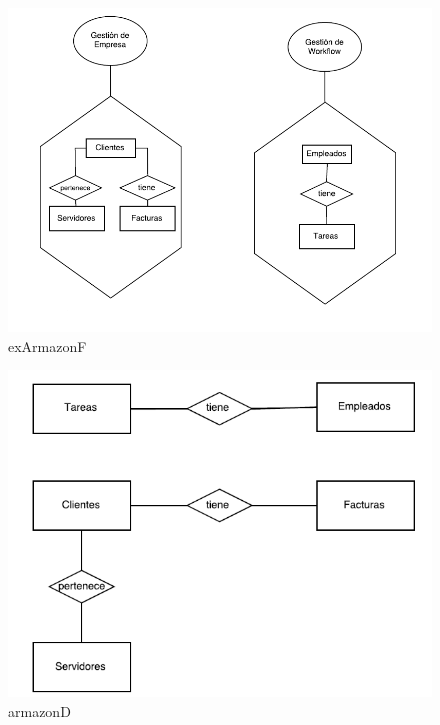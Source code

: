 \documentclass[paper=a4, fontsize=11pt, spanish]{scrartcl}
\begin{document}
\begin{figure}
	\includegraphics[width=1.25\textwidth]{exArmazonF.png}
	\caption{exArmazonF}
	\label{fig:exArmazonF}
\end{figure}

\begin{figure}
	\includegraphics{ArmazonD.png}
	\caption{armazonD}
	\label{fig:armazonD}
\end{figure}
\end{document}
